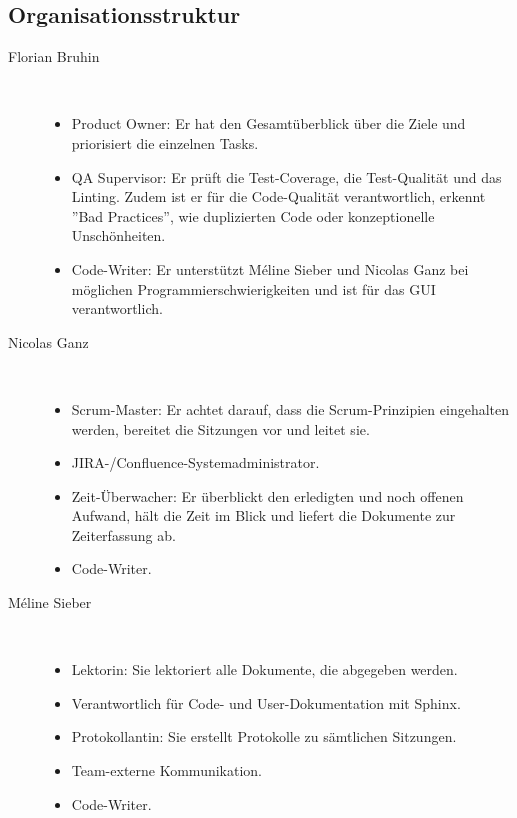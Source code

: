 \documentclass[a4paper]{article}
\begin{document}
\subsection{Organisationsstruktur}
\begin{description}

\item[Florian Bruhin] \strut \\[-1em]
  \begin{itemize}
    \item Product Owner: Er hat den Gesamtüberblick über die Ziele und priorisiert die einzelnen Tasks.
    \item QA Supervisor: Er prüft die Test-Coverage, die Test-Qualität und das Linting. Zudem ist er für die Code-Qualität verantwortlich, erkennt ''Bad Practices'', wie duplizierten Code oder konzeptionelle Unschönheiten.
    \item Code-Writer: Er unterstützt Méline Sieber und Nicolas Ganz bei möglichen Programmierschwierigkeiten und ist für das GUI verantwortlich.
  \end{itemize}
\item[Nicolas Ganz] \strut \\[-1em]
  \begin{itemize}
    \item Scrum-Master: Er achtet darauf, dass die Scrum-Prinzipien eingehalten werden, bereitet die Sitzungen vor und leitet sie.
    \item JIRA-/Confluence-Systemadministrator.
    \item Zeit-Überwacher: Er überblickt den erledigten und noch offenen Aufwand, hält die Zeit im Blick und liefert die Dokumente zur Zeiterfassung ab.
    \item Code-Writer.
  \end{itemize}
\item[Méline Sieber] \strut \\[-1em]
  \begin{itemize}
    \item Lektorin: Sie lektoriert alle Dokumente, die abgegeben werden.
    \item Verantwortlich für Code- und User-Dokumentation mit Sphinx.
    \item Protokollantin: Sie erstellt Protokolle zu sämtlichen Sitzungen.
    \item Team-externe Kommunikation.
    \item Code-Writer.
  \end{itemize}
\end{description}
\end{document}
